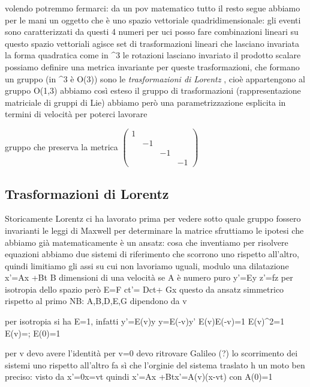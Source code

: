volendo potremmo fermarci: da un pov matematico tutto il resto segue 
abbiamo per le mani un oggetto che è uno spazio vettoriale quadridimensionale: gli eventi sono caratterizzati da questi 4 numeri per uci posso fare combinazioni lineari
su questo spazio vettoriali agisce set di trasformazioni lineari che lasciano invariata la forma quadratica
come in \realset^3 le rotazioni lasciano invariato il prodotto scalare
possiamo definire una metrica invariante per queste trasformazioni, che formano un gruppo (in \realset^3 è O(3))
sono le \textit{trasformazioni di Lorentz} , cioè appartengono al gruppo O(1,3)
abbiamo così esteso il gruppo di trasformazioni
(rappresentazione matriciale di gruppi di Lie)
abbiamo però una parametrizzazione esplicita in termini di velocità per poterci lavorare

gruppo che preserva la metrica $\begin{pmatrix}
	1 & & &\\
	& -1 & & \\
	& & -1 &\\
	& & & -1
\end{pmatrix}$

\subsection{Trasformazioni di Lorentz}
Storicamente Lorentz ci ha lavorato prima per vedere sotto quale gruppo fossero invarianti le leggi di Maxwell
per determinare la matrice sfruttiamo le ipotesi che abbiamo già
matematicamente è un ansatz: cosa che inventiamo per risolvere equazioni	
abbiamo due sistemi di riferimento che scorrono uno rispetto all'altro, quindi limitiamo gli assi su cui non lavoriamo uguali, modulo una dilatazione
	x'=Ax +Bt	B dimensioni di una velocità se A è numero puro
	y'=Ey
	z'=fz 	per isotropia dello spazio però E=F
	ct'= Dct+ Gx	questo da ansatz simmetrico rispetto al primo
NB: A,B,D,E,G dipendono da v

per isotropia si ha E=1, infatti
	y'=E(v)y \implies y=E(-v)y' \implies E(v)E(-v)=1 \implies E(v)^2=1 \implies E(v)=; E(0)=1
	
per v devo avere l'identità per v=0 devo ritrovare Galileo (?)
lo scorrimento dei sistemi uno rispetto all'altro fa sì che l'orginie del sistema traslato h un moto ben preciso: visto da  
	x'=0\impiles x=vt	
quindi 
	x'=Ax +Bt\implies x'=A(v)(x-vt) con A(0)=1
	

